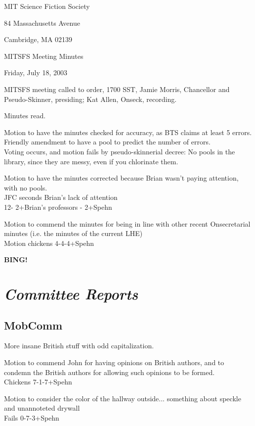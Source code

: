 \documentclass[12pt]{article}
\newcommand{\bing}{{\bf BING!} }
\newcommand{\goto}[1]{\bing \vskip 12pt \section*{{\em{#1}}}}
\begin{document}
\begin{center}

MIT Science Fiction Society 

84 Massachusetts Avenue

Cambridge, MA 02139

\vspace{12pt}

MITSFS Meeting Minutes 

Friday, July 18, 2003

\end{center}
 
\vspace{18pt}

\setlength{\parskip}{6pt}

\noindent
MITSFS meeting called to order, 1700 SST, Jamie Morris, Chancellor and
Pseudo-Skinner, presiding; Kat Allen,  Onseck, recording.

Minutes read.

Motion to have the minutes checked for accuracy, as BTS claims at
least 5 errors.\\
Friendly amendment to have a pool to predict the number of errors.\\
Voting occurs, and motion fails by pseudo-skinnerial decree: No pools in the library, since they
are messy, even if you chlorinate them.

Motion to have the minutes corrected because Brian wasn't paying
attention, with no pools.\\
JFC seconds Brian's lack of attention\\
12- 2+Brian's professors - 2+Spehn

Motion to commend the minutes for being in line with other recent
Onsecretarial minutes (i.e. the minutes of the current LHE)\\
Motion chickens 4-4-4+Spehn

\goto{Committee Reports}

\subsection*{MobComm}
More insane British stuff with odd capitalization.

Motion to commend John for having opinions on British authors, and to
condemn the British authors for allowing such opinions to be formed.\\
Chickens 7-1-7+Spehn

Motion to consider the color of the hallway outside... something about
speckle and unannoteted drywall\\
Fails 0-7-3+Spehn
\end{document}
